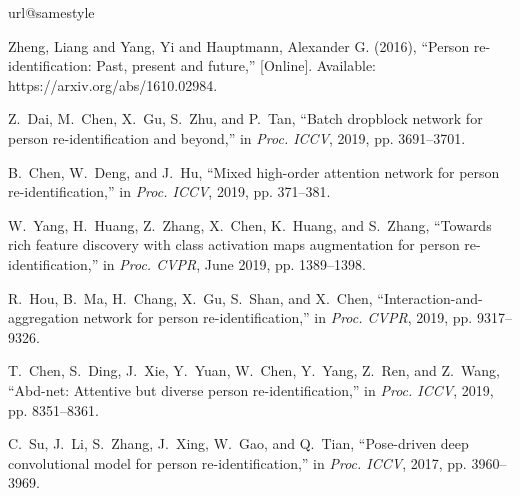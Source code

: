 \documentclass[journal]{IEEEtran}
\begin{document}
\begin{thebibliography}{10}
\providecommand{\url}[1]{#1}
\csname url@samestyle\endcsname
\providecommand{\newblock}{\relax}
\providecommand{\bibinfo}[2]{#2}
\providecommand{\BIBentrySTDinterwordspacing}{\spaceskip=0pt\relax}
\providecommand{\BIBentryALTinterwordstretchfactor}{4}
\providecommand{\BIBentryALTinterwordspacing}{\spaceskip=\fontdimen2\font plus
\BIBentryALTinterwordstretchfactor\fontdimen3\font minus
  \fontdimen4\font\relax}
\providecommand{\BIBforeignlanguage}[2]{{\expandafter\ifx\csname l@#1\endcsname\relax
\typeout{** WARNING: IEEEtran.bst: No hyphenation pattern has been}\typeout{** loaded for the language `#1'. Using the pattern for}\typeout{** the default language instead.}\else
\language=\csname l@#1\endcsname
\fi
#2}}
\providecommand{\BIBdecl}{\relax}
\BIBdecl

{Zheng, Liang and Yang, Yi and Hauptmann, Alexander G. {(2016)}}, ``Person
  re-identification: Past, present and future,'' [Online]. Available:
  https://arxiv.org/abs/1610.02984.

Z.~{Dai}, M.~{Chen}, X.~{Gu}, S.~{Zhu}, and P.~{Tan}, ``Batch dropblock network
  for person re-identification and beyond,'' in \emph{Proc. ICCV}, 2019, pp.
  3691--3701.

B.~{Chen}, W.~{Deng}, and J.~{Hu}, ``Mixed high-order attention network for
  person re-identification,'' in \emph{Proc. ICCV}, 2019, pp. 371--381.

W.~{Yang}, H.~{Huang}, Z.~{Zhang}, X.~{Chen}, K.~{Huang}, and S.~{Zhang},
  ``Towards rich feature discovery with class activation maps augmentation for
  person re-identification,'' in \emph{Proc. CVPR}, June 2019, pp. 1389--1398.

R.~{Hou}, B.~{Ma}, H.~{Chang}, X.~{Gu}, S.~{Shan}, and X.~{Chen},
  ``Interaction-and-aggregation network for person re-identification,'' in
  \emph{Proc. CVPR}, 2019, pp. 9317--9326.

T.~{Chen}, S.~{Ding}, J.~{Xie}, Y.~{Yuan}, W.~{Chen}, Y.~{Yang}, Z.~{Ren}, and
  Z.~{Wang}, ``Abd-net: Attentive but diverse person re-identification,'' in
  \emph{Proc. ICCV}, 2019, pp. 8351--8361.

C.~{Su}, J.~{Li}, S.~{Zhang}, J.~{Xing}, W.~{Gao}, and Q.~{Tian}, ``Pose-driven
  deep convolutional model for person re-identification,'' in \emph{Proc.
  ICCV}, 2017, pp. 3960--3969.


\end{thebibliography}
\end{document}
